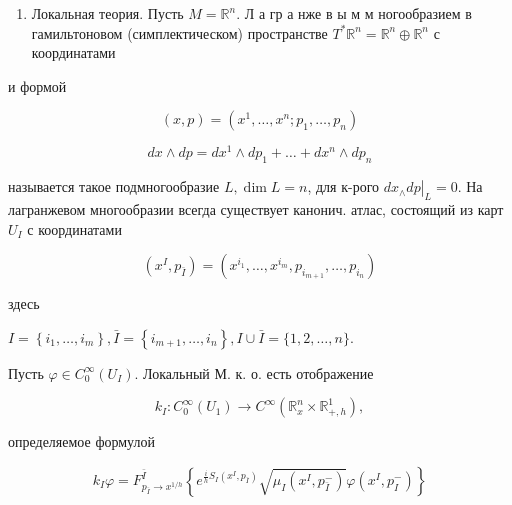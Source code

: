 \documentclass[10pt]{article}
\begin{document}
\begin{enumerate}

  \item Локальная теория. Пусть $M=\mathbb{R}^{n}$. Л а гр а нже в ы м м ногообразием в гамильтоновом (симплектическом) пространстве $T^{*} \mathbb{R}^{n}=\mathbb{R}^{n} \oplus \mathbb{R}^{n}$ с координатами

\end{enumerate}



и формой



\[

(x, p)=\left(x^{1}, \ldots, x^{n} ; p_{1}, \ldots, p_{n}\right)

\]



\[

d x \wedge d p=d x^{1} \wedge d p_{1}+\ldots+d x^{n} \wedge d p_{n}

\]



называется такое подмногообразие $L, \operatorname{dim} L=n$, для к-рого $\left.d x_{\wedge} d p\right|_{L}=0$. На лагранжевом многообразии всегда существует канонич. атлас, состоящий из карт $U_{I}$ с координатами



\[

\left(x^{I}, p_{\bar{I}}\right)=\left(x^{i_{1}}, \ldots, x^{i_{m}}, p_{i_{m+1}}, \ldots, p_{i_{n}}\right)

\]



здесь



$I=\left\{i_{1}, \ldots, i_{m}\right\}, \bar{I}=\left\{i_{m+1}, \ldots, i_{n}\right\}, I \cup \bar{I}=\{1,2, \ldots, n\}$.



Пусть $\varphi \in C_{0}^{\infty}\left(U_{I}\right)$. Локальный М. к. о. есть отображение



\[

k_{I}: C_{0}^{\infty}\left(U_{1}\right) \rightarrow C^{\infty}\left(\mathbb{R}_{x}^{n} \times \mathbb{R}_{+, h}^{1}\right),

\]



определяемое формулой



\[

k_{I} \varphi=F_{p_{\bar{I}} \rightarrow x^{1 / h}}^{\bar{I}}\left\{e^{\frac{i}{h} S_{I}\left(x^{I}, p_{\bar{I}}\right)} \sqrt{\mu_{I}\left(x^{I}, p_{\bar{I}}^{-}\right)} \varphi\left(x^{I}, p_{I}^{-}\right)\right\}

\]
\end{document}
